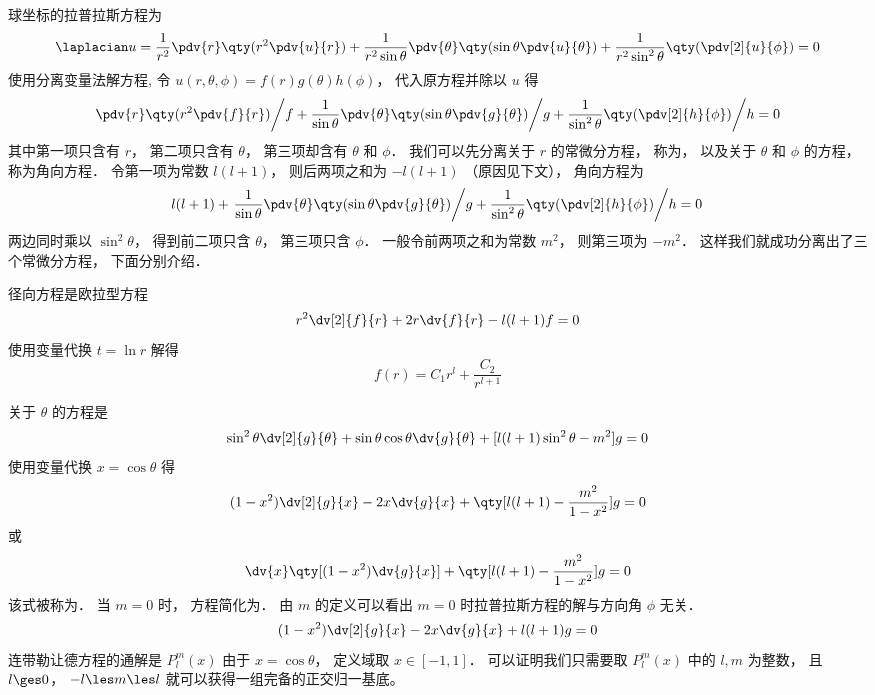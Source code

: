 

球坐标的拉普拉斯方程为
\begin{equation}
\laplacian u = \frac{1}{r^2} \pdv{r} \qty(r^2 \pdv{u}{r}) + \frac{1}{r^2 \sin\theta}\pdv{\theta} \qty(\sin \theta \pdv{u}{\theta}) + \frac{1}{r^2 \sin^2 \theta} \qty(\pdv[2]{u}{\phi}) = 0
\end{equation}
使用分离变量法解方程, 令 $u(r, \theta, \phi) = f(r)g(\theta)h(\phi)$， 代入原方程并除以 $u$ 得
\begin{equation}
\left. \pdv{r} \qty(r^2 \pdv{f}{r}) \middle/ f + \frac{1}{\sin\theta}\pdv{\theta} \qty(\sin \theta \pdv{g}{\theta}) \middle/ g + \frac{1}{\sin^2 \theta} \qty(\pdv[2]{h}{\phi}) \middle/ h = 0 \right.
\end{equation}
其中第一项只含有 $r$， 第二项只含有 $\theta$， 第三项却含有 $\theta$ 和 $\phi$． 我们可以先分离关于 $r$ 的常微分方程， 称为， 以及关于 $\theta$ 和 $\phi$ 的方程， 称为角向方程． 令第一项为常数 $l(l+1)$， 则后两项之和为 $-l(l+1)$ （原因见下文）， 角向方程为
\begin{equation}\label{SphLap_eq3}
l(l+1) + \left. \frac{1}{\sin\theta}\pdv{\theta} \qty(\sin \theta \pdv{g}{\theta}) \middle/ g + \frac{1}{\sin^2 \theta} \qty(\pdv[2]{h}{\phi}) \middle/ h = 0 \right.
\end{equation}
两边同时乘以 $\sin^2\theta$， 得到前二项只含 $\theta$， 第三项只含 $\phi$． 一般令前两项之和为常数 $m^2$， 则第三项为 $-m^2$． 这样我们就成功分离出了三个常微分方程， 下面分别介绍．

径向方程是欧拉型方程%
\begin{equation}
r^2\dv[2]{f}{r} + 2r\dv{f}{r} - l(l+1)f = 0
\end{equation}
使用变量代换 $t = \ln r$ 解得
\begin{equation}
f(r) = C_1 r^l + \frac{C_2}{r^{l+1}}
\end{equation}

关于 $\theta$ 的方程是
\begin{equation}
\sin^2\theta \dv[2]{g}{\theta} + \sin\theta\cos\theta\dv{g}{\theta} + [l(l+1)\sin^2\theta - m^2] g = 0
\end{equation}
使用变量代换 $x = \cos\theta$ 得
\begin{equation}
(1-x^2)\dv[2]{g}{x} - 2x\dv{g}{x} + \qty[l(l+1) - \frac{m^2}{1-x^2}]g = 0
\end{equation}
或
\begin{equation}
\dv{x} \qty[(1-x^2)\dv{g}{x}] + \qty[l(l+1) - \frac{m^2}{1-x^2}]g = 0
\end{equation}
该式被称为． 当 $m = 0$ 时， 方程简化为． 由 $m$ 的定义可以看出 $m = 0$ 时拉普拉斯方程的解与方向角 $\phi$ 无关．
\begin{equation}
(1-x^2)\dv[2]{g}{x} - 2x\dv{g}{x} + l(l+1)g = 0
\end{equation}
连带勒让德方程的通解是%
$P_l^m(x)$ 由于 $x = \cos\theta$， 定义域取 $x \in [-1, 1]$． 可以证明我们只需要取 $P_l^m(x)$ 中的 $l, m$ 为整数， 且 $l \ges 0$， $-l \les m \les l$ 就可以获得一组完备的正交归一基底。 %


